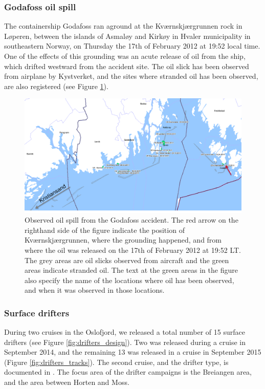 \subsubsection{Godafoss oil spill}
The containership Godafoss ran aground at the Kv{\ae}rnskj{\ae}rgrunnen rock in L{\o}peren, between the islands of Asmal{\o}y and Kirk{\o}y in Hvaler municipality in southeastern Norway, on Thursday the 17th of February 2012 at 19:52 local time. One of the effects of this grounding was an acute release of oil from the ship, which drifted westward from the accident site. The oil slick has been observed from airplane by Kystverket, and the sites where stranded oil has been observed, are also registered (see Figure \ref{fig:godafoss_oil}).

\begin{figure}[ht]
\centerline{
\includegraphics*[width=\textwidth]{Figurer/Godafoss}
}
\caption{\small
Observed oil spill from the Godafoss accident. The red arrow on the righthand side of the figure indicate the position of Kv{\ae}rnskj{\ae}rgrunnen, where the grounding happened, and from where the oil was released on the 17th of February 2012 at 19:52 LT. The grey areas are oil slicks observed from aircraft and the green areas indicate stranded oil. The text at the green areas in the figure also specify the name of the locations where oil has been observed, and when it was observed in those locations.}
\label{fig:godafoss_oil}
\end{figure}

\subsubsection{Surface drifters}
During two cruises in the Oslofjord, we released a total number of 15 surface drifters (see Figure \ref{fig:drifters_design}). Two was released during a cruise in September 2014, and the remaining 13 was released in a cruise in September 2015 (Figure \ref{fig:drifters_tracks}). The second cruise, and the drifter type, is documented in \cite{hjelm:etal:2016}. The focus area of the drifter campaigns is the Breiangen area, and the area between Horten and Moss.

